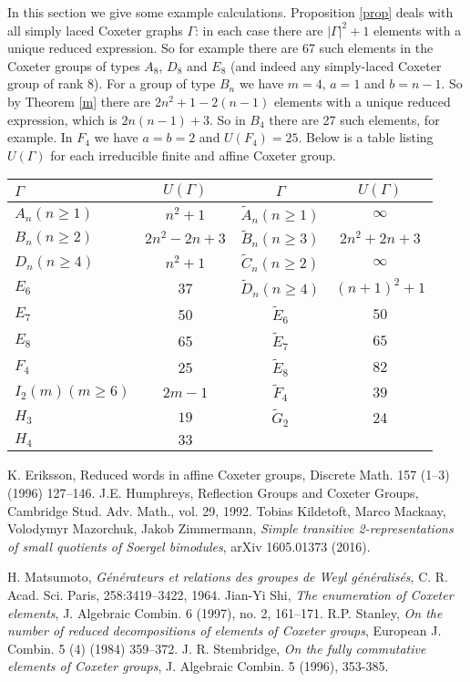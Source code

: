\documentclass[a4paper,12pt]{article}
\theoremstyle{definition}
\begin{document}
In this section we give some example calculations. Proposition \ref{prop} deals with all simply laced Coxeter graphs $\Gamma$: in each case there are $|\Gamma|^2 + 1$ elements with a unique reduced expression. So for example there are 67 such elements in the Coxeter groups of types $A_8$, $D_8$ and $E_8$ (and indeed any simply-laced Coxeter group of rank 8). For a group of type $B_n$ we have  $m=4$, $a=1$ and $b=n-1$. So by Theorem \ref{m} there are 
$2n^2 + 1 - 2(n-1)$ elements with a unique reduced expression, which is $2n(n-1) + 3$. So in $B_4$ there are 27 such elements, for example. In $F_4$ we have $a = b = 2$ and $U(F_4) = 25$. Below is a table listing $U(\Gamma)$ for each irreducible finite and affine Coxeter group.
\begin{center}
\begin{tabular}{|l|c|c|c|} \hline $\Gamma$ & $U(\Gamma)$ & $\Gamma$ & $U(\Gamma)$\\
\hline
$A_n (n \geq 1)$ & $n^2 + 1$ & $\tilde A_n (n \geq 1)$ & $\infty$\\
$B_n (n \geq 2)$ & $2n^2 - 2n + 3$ & $\tilde B_n (n \geq 3)$ & $2n^2 + 2n + 3$ \\
$D_n (n \geq 4)$ & $n^2 + 1$  & $\tilde C_n (n \geq 2)$ & $\infty$\\
$E_6$ & 37 & $\tilde D_n (n \geq 4)$ & $(n+1)^2 + 1$\\
    $E_7$ & 50  & $\tilde E_6$ & $50$\\
$E_8$ & 65 & $\tilde E_7$ & $65$\\
$F_4$ & 25  & $\tilde E_8$ & $82$\\
$I_2(m) (m \geq 6)$ & $2m-1$ & $\tilde F_4$ & $39$\\
$H_3$ & $19$  & $\tilde G_2$ & 24\\
  $H_4$ & $33$ && \\ \hline
\end{tabular}
\end{center}

\begin{thebibliography}{9}

 K. Eriksson, Reduced words in affine Coxeter groups, Discrete Math. 157 (1--3) (1996) 127--146. 
 J.E. Humphreys, Reflection Groups and Coxeter Groups, Cambridge Stud. Adv. Math., vol. 29, 1992.  
 Tobias Kildetoft, Marco Mackaay, Volodymyr Mazorchuk, Jakob Zimmermann, {\em Simple transitive 2-representations of small quotients of Soergel bimodules}, arXiv 1605.01373 (2016).

 H. Matsumoto, {\em G\'{e}n\'{e}rateurs et relations des groupes de Weyl g\'{e}n\'{e}ralis\'{e}s}, C. R. Acad. Sci. Paris, 258:3419--3422, 1964.
 Jian-Yi Shi, {\em The enumeration of Coxeter elements}, J. Algebraic Combin. 6 (1997), no. 2, 161--171.
 R.P. Stanley, {\em On the number of reduced decompositions of elements of Coxeter groups}, European J. Combin. 5 (4) (1984) 359--372.
 J. R. Stembridge, {\em On the fully commutative elements of Coxeter groups}, J. Algebraic
Combin. 5 (1996), 353-385.

\end{thebibliography}
 
\end{document}

